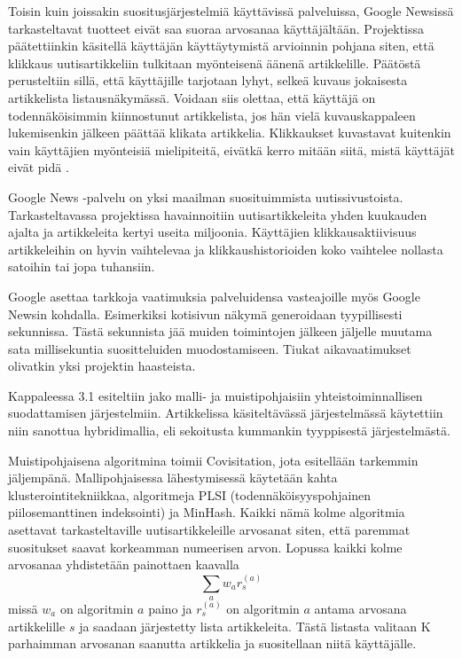 \documentclass[12pt,finnish]{tktltiki2}
\theoremstyle{definition}
\theoremstyle{remark}
\begin{document}
Toisin kuin joissakin suositusjärjestelmiä käyttävissä palveluissa, Google Newsissä tarkasteltavat tuotteet eivät saa suoraa arvosanaa käyttäjältään. Projektissa päätettiinkin käsitellä käyttäjän käyttäytymistä arvioinnin pohjana siten, että klikkaus uutisartikkeliin tulkitaan myönteisenä äänenä artikkelille. Päätöstä perusteltiin sillä, että käyttäjille tarjotaan lyhyt, selkeä kuvaus jokaisesta artikkelista listausnäkymässä. Voidaan siis olettaa, että käyttäjä on todennäköisimmin kiinnostunut artikkelista, jos hän vielä kuvauskappaleen lukemisenkin jälkeen päättää klikata artikkelia. Klikkaukset kuvastavat kuitenkin vain käyttäjien myönteisiä mielipiteitä, eivätkä kerro mitään siitä, mistä käyttäjät eivät pidä \cite{Das:2007:GNP:1242572.1242610}.

Google News -palvelu on yksi maailman suosituimmista uutissivustoista. Tarkasteltavassa projektissa havainnoitiin uutisartikkeleita yhden kuukauden ajalta ja artikkeleita kertyi useita miljoonia. Käyttäjien klikkausaktiivisuus artikkeleihin on hyvin vaihtelevaa ja klikkaushistorioiden koko vaihtelee nollasta satoihin tai jopa tuhansiin.

Google asettaa tarkkoja vaatimuksia palveluidensa vasteajoille myös Google Newsin kohdalla. Esimerkiksi kotisivun näkymä generoidaan tyypillisesti sekunnissa. Tästä sekunnista jää muiden toimintojen jälkeen jäljelle muutama sata millisekuntia suositteluiden muodostamiseen. Tiukat aikavaatimukset olivatkin yksi projektin haasteista.

Kappaleessa 3.1 esiteltiin jako malli- ja muistipohjaisiin yhteistoiminnallisen suodattamisen järjestelmiin. Artikkelissa käsiteltävässä järjestelmässä käytettiin niin sanottua hybridimallia, eli sekoitusta kummankin tyyppisestä järjestelmästä.

Muistipohjaisena algoritmina toimii Covisitation, jota esitellään tarkemmin jäljempänä. Mallipohjaisessa lähestymisessä käytetään kahta klusterointitekniikkaa, algoritmeja PLSI (todennäköisyyspohjainen piilosemanttinen indeksointi) ja MinHash. Kaikki nämä kolme algoritmia asettavat tarkasteltaville uutisartikkeleille arvosanat siten, että paremmat suositukset saavat korkeamman numeerisen arvon. Lopussa kaikki kolme arvosanaa yhdistetään painottaen kaavalla
\begin{displaymath}
\sum_a{w_a r^{(a)}_{s}}
\end{displaymath}
missä $w_a$ on algoritmin $a$ paino ja $r^{(a)}_{s}$ on algoritmin $a$ antama arvosana artikkelille $s$ ja saadaan järjestetty lista artikkeleita. Tästä listasta valitaan K parhaimman arvosanan saanutta artikkelia ja suositellaan niitä käyttäjälle.
\end{document}
